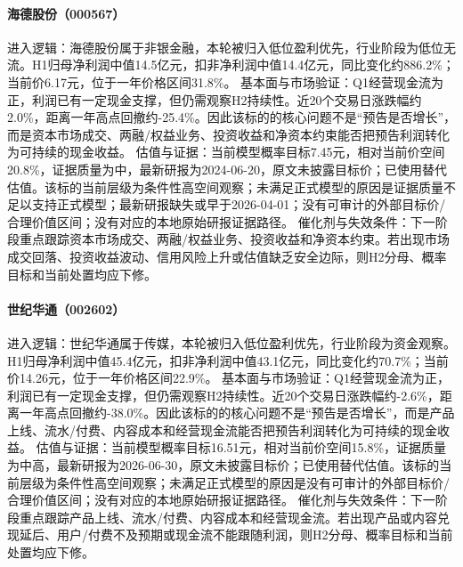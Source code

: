 \paragraph{海德股份（000567）}
进入逻辑：海德股份属于非银金融，本轮被归入低位盈利优先，行业阶段为低位无流。H1归母净利润中值14.5亿元，扣非净利润中值14.4亿元，同比变化约886.2\%；当前价6.17元，位于一年价格区间31.8\%。
基本面与市场验证：Q1经营现金流为正，利润已有一定现金支撑，但仍需观察H2持续性。近20个交易日涨跌幅约2.0\%，距离一年高点回撤约-25.4\%。因此该标的的核心问题不是“预告是否增长”，而是资本市场成交、两融/权益业务、投资收益和净资本约束能否把预告利润转化为可持续的现金收益。
估值与证据：当前模型概率目标7.45元，相对当前价空间20.8\%，证据质量为中，最新研报为2024-06-20，原文未披露目标价；已使用替代估值。该标的当前层级为条件性高空间观察；未满足正式模型的原因是证据质量不足以支持正式模型；最新研报缺失或早于2026-04-01；没有可审计的外部目标价/合理价值区间；没有对应的本地原始研报证据路径。
催化剂与失效条件：下一阶段重点跟踪资本市场成交、两融/权益业务、投资收益和净资本约束。若出现市场成交回落、投资收益波动、信用风险上升或估值缺乏安全边际，则H2分母、概率目标和当前处置均应下修。

\paragraph{世纪华通（002602）}
进入逻辑：世纪华通属于传媒，本轮被归入低位盈利优先，行业阶段为资金观察。H1归母净利润中值45.4亿元，扣非净利润中值43.1亿元，同比变化约70.7\%；当前价14.26元，位于一年价格区间22.9\%。
基本面与市场验证：Q1经营现金流为正，利润已有一定现金支撑，但仍需观察H2持续性。近20个交易日涨跌幅约-2.6\%，距离一年高点回撤约-38.0\%。因此该标的的核心问题不是“预告是否增长”，而是产品上线、流水/付费、内容成本和经营现金流能否把预告利润转化为可持续的现金收益。
估值与证据：当前模型概率目标16.51元，相对当前价空间15.8\%，证据质量为中高，最新研报为2026-06-30，原文未披露目标价；已使用替代估值。该标的当前层级为条件性高空间观察；未满足正式模型的原因是没有可审计的外部目标价/合理价值区间；没有对应的本地原始研报证据路径。
催化剂与失效条件：下一阶段重点跟踪产品上线、流水/付费、内容成本和经营现金流。若出现产品或内容兑现延后、用户/付费不及预期或现金流不能跟随利润，则H2分母、概率目标和当前处置均应下修。

